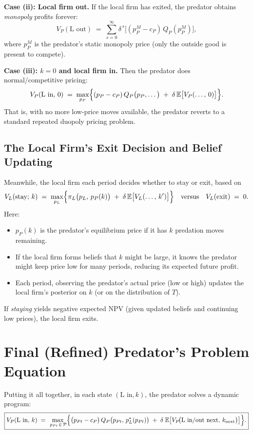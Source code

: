 \documentclass[12pt,oneside]{article}
\theoremstyle{definition}
\theoremstyle{remark}
\begin{document}
\vspace{1em}
\noindent
\textbf{Case (ii): Local firm out.}
If the local firm has exited, the predator obtains \emph{monopoly} profits forever:
\[
V_P(\text{L out})
\;=\;
\sum_{s=0}^{\infty}
\delta^{\,s}
\bigl[
(p_{P}^{M} - c_P)\,Q_{P}(p_{P}^{M})
\bigr],
\]
where $p_{P}^{M}$ is the predator's static monopoly price (only the outside good is present to compete).

\vspace{1em}
\noindent
\textbf{Case (iii): $k=0$ and local firm in.}
Then the predator does normal/competitive pricing:
\[
V_P(\text{L in},\, 0)
\;=\;
\max_{p_P}
\Bigl\{
(p_P - c_P)\,Q_P\bigl(p_P,\dots\bigr)
\;+\;
\delta\,\mathbb{E}\bigl[V_P(\dots,\, 0)\bigr]
\Bigr\}.
\]
That is, with no more low-price moves available, the predator reverts to a standard repeated duopoly pricing problem.

\subsection{The Local Firm's Exit Decision and Belief Updating}

Meanwhile, the local firm each period decides whether to stay or exit, based on
\[
V_L(\text{stay};\,k)
\;=\;
\max_{p_L}
\Bigl\{
\pi_L\bigl(p_L,\,p_P(k)\bigr)
\;+\;
\delta\,\mathbb{E}\bigl[V_L(\dots,\,k')\bigr]
\Bigr\}
\quad\text{versus}\quad
V_L(\text{exit}) \;=\; 0.
\]
Here:
\begin{itemize}
\item $p_{P}(k)$ is the predator's equilibrium price if it has $k$ predation moves remaining.
\item If the local firm forms beliefs that $k$ might be large, it knows the predator might keep price low for many periods, reducing its expected future profit.
\item Each period, observing the predator's actual price (low or high) updates the local firm's posterior on $k$ (or on the distribution of $T$).
\end{itemize}
If \emph{staying} yields negative expected NPV (given updated beliefs and continuing low prices), the local firm exits.

\section{Final (Refined) Predator's Problem Equation}

Putting it all together, in each state $(\text{L in}, k)$, the predator solves a dynamic program:
\[
\boxed{
V_{P}(\text{L in},\, k)
\;=\;
\max_{\,p_{Pt}\,\in\,\mathcal{P}}
\Bigl\{
\bigl(p_{Pt} - c_{P}\bigr)\,Q_{P}\bigl(p_{Pt},\,p_{L}^{*}(p_{Pt})\bigr)
\;+\;
\delta\;\mathbb{E}\bigl[
V_{P}\!\bigl(\text{L in/out next},\,k_{\text{next}}\bigr)
\bigr]
\Bigr\}.
}
\]
\end{document}
